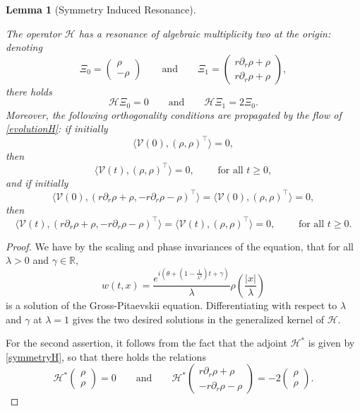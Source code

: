 \documentclass[11 pt]{amsart}
\newtheorem{lem}{Lemma}[section]
\theoremstyle{definition}
\theoremstyle{remark}
\numberwithin{equation}{section}
\begin{document}
\begin{lem}[Symmetry Induced Resonance]\label{ResonanceLemma}

The operator $\mathcal H$ has a resonance of algebraic multiplicity two at the origin: denoting
\begin{equation}
\label{defXi0Xi1}
\Xi_0 = \begin{pmatrix} \rho \\ -\rho \end{pmatrix} \qquad \mbox{and} \qquad \Xi_1 =  \begin{pmatrix} r\partial_r \rho +\rho \\r\partial_r \rho +\rho \end{pmatrix},
\end{equation}
there holds
$$
\mathcal H \Xi_0 =0 \qquad \mbox{and} \qquad \mathcal H \Xi_1 =2 \Xi_0.
$$
Moreover, the following orthogonality conditions are propagated by the flow of \eqref{evolutionH}: if initially
$$
 \langle \mathcal{V}(0), (\rho,\rho)^\top\rangle =0,
$$
then
$$
 \langle \mathcal{V} (t), (\rho,\rho)^\top\rangle =0, \qquad \mbox{ for all }t \geq0,
$$
and if initially
$$
 \langle \mathcal{V} (0), (r\partial_r \rho+\rho,-r\partial_r\rho-\rho)^\top\rangle = \langle \mathcal{V} (0), (\rho,\rho)^\top\rangle =0,
$$
then 
$$
\langle \mathcal{V} (t), (r\partial_r \rho+\rho, - r\partial_r\rho-\rho)^\top\rangle= \langle \mathcal{V} (t), (\rho,\rho)^\top\rangle =0, \qquad \mbox{ for all }t \geq0 .
$$

\end{lem}


\begin{proof}

We have by the scaling and phase invariances of the equation, that for all $\lambda>0$ and $\gamma\in \mathbb R$,
$$
w(t,x)=\frac{e^{i(\theta +(1-\frac{1}{\lambda^2})t+\gamma)}}{\lambda}\rho\left(\frac{|x|}{\lambda}\right)
$$
is a solution of the Gross-Pitaevskii equation. Differentiating with respect to $\lambda$ and $\gamma$ at $\lambda =1$ gives the two desired solutions in the generalized kernel of $\mathcal H$.

For the second assertion, it follows from the fact that the adjoint $\mathcal H^*$ is given by \eqref{symmetryH}, so that there holds the relations
$$
\mathcal H^* \begin{pmatrix} \rho \\ \rho \end{pmatrix}=0 \qquad \mbox{and} \qquad \mathcal H^* \begin{pmatrix} r\partial_r \rho +\rho \\ -r\partial_r \rho -\rho \end{pmatrix}=-2 \begin{pmatrix} \rho \\ \rho \end{pmatrix}.
$$
\end{proof}
\end{document}
